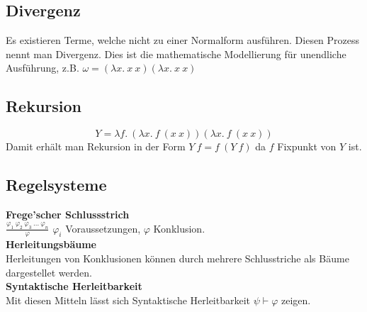 \subsection{Divergenz}
Es existieren Terme, welche nicht zu einer Normalform ausführen. Diesen Prozess nennt man Divergenz.
Dies ist die mathematische Modellierung für unendliche Ausführung, z.B.
\(\omega = (\lambda x.\ x\ x)(\lambda x.\ x\ x)\)

\subsection{Rekursion}
\[Y = \lambda f.\ (\lambda x.\ f\ (x\ x))(\lambda x.\ f\ (x\ x))\]
Damit erhält man Rekursion in der Form \(Y\ f = f\ (Y\ f)\) da \(f\) Fixpunkt von \(Y\) ist.


\subsection{Regelsysteme}
\textbf{Frege'scher Schlussstrich}\\
\(\frac{\varphi_1\ \varphi_2\ \varphi_3\ \ldots\ \varphi_n}{\varphi}\) \(\varphi_i\) Voraussetzungen, \(\varphi\) Konklusion.\\
\textbf{Herleitungsbäume}\\
Herleitungen von Konklusionen können durch mehrere Schlusstriche als Bäume dargestellet werden.\\
\textbf{Syntaktische Herleitbarkeit}\\
Mit diesen Mitteln lässt sich Syntaktische Herleitbarkeit \(\psi \vdash \varphi\) zeigen.
